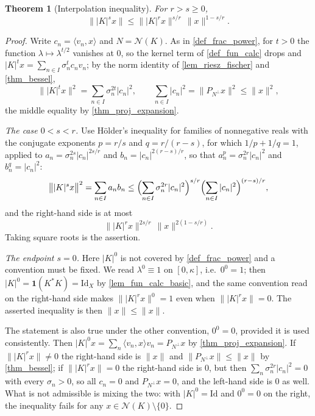 \documentclass[a4paper]{report}
\theoremstyle{plain}
\newtheorem{theorem}{Theorem}[chapter]
\theoremstyle{definition}
\theoremstyle{remark}
\begin{document}
\begin{theorem}[Interpolation inequality]
  \label{thm_interpolation}
  For $r > s \ge 0$,
  \[
    \||K|^sx\| \le \||K|^rx\|^{s/r}\,\|x\|^{1-s/r}.
  \]
\end{theorem}
\begin{proof}
  Write $c_n = \langle v_n,x\rangle$ and $N = \mathcal{N}(K)$.  As in
  \cref{def_frac_power}, for $t > 0$ the function $\lambda \mapsto \lambda^{t/2}$ vanishes
  at $0$, so the kernel term of \cref{def_fun_calc} drops and
  $|K|^tx = \sum_{n\in I}\sigma_n^tc_nv_n$; by the norm identity of
  \cref{lem_riesz_fischer} and \cref{thm_bessel},
  \[
    \bigl\||K|^tx\bigr\|^2 = \sum_{n\in I}\sigma_n^{2t}|c_n|^2 , \qquad
    \sum_{n\in I}|c_n|^2 = \|P_{N^\perp}x\|^2 \le \|x\|^2 ,
  \]
  the middle equality by \cref{thm_proj_expansion}.

  \emph{The case $0 < s < r$.}  Use H\"older's inequality for families of nonnegative reals
  with the conjugate exponents $p = r/s$ and $q = r/(r-s)$, for which
  $1/p + 1/q = 1$, applied to $a_n = \sigma_n^{2s}|c_n|^{2s/r}$ and
  $b_n = |c_n|^{2(r-s)/r}$, so that $a_n^p = \sigma_n^{2r}|c_n|^2$ and $b_n^q = |c_n|^2$:
  \[
    \bigl\||K|^sx\bigr\|^2 = \sum_{n\in I}a_nb_n
      \le \Bigl(\sum_{n\in I}\sigma_n^{2r}|c_n|^2\Bigr)^{s/r}
          \Bigl(\sum_{n\in I}|c_n|^2\Bigr)^{(r-s)/r} ,
  \]
  and the right-hand side is at most
  \[
    \bigl\||K|^rx\bigr\|^{2s/r}\,\|x\|^{2(1-s/r)} .
  \]
  Taking square roots is the assertion.

  \emph{The endpoint $s = 0$.}  Here $|K|^0$ is not covered by \cref{def_frac_power} and a
  convention must be fixed.  We read $\lambda^0 \equiv 1$ on $[0,\kappa]$, i.e.\
  $0^0 = 1$; then $|K|^0 = \mathbf{1}(K^*K) = \mathrm{Id}_X$ by
  \cref{lem_fun_calc_basic}, and the same convention read on the right-hand side makes
  $\||K|^rx\|^0 = 1$ even when $\||K|^rx\| = 0$.  The asserted inequality is then
  $\|x\| \le \|x\|$.

  The statement is also true under the other convention, $0^0 = 0$, provided it is used
  consistently.  Then $|K|^0x = \sum_n\langle v_n,x\rangle v_n = P_{N^\perp}x$ by
  \cref{thm_proj_expansion}.  If $\||K|^rx\| \ne 0$ the right-hand side is $\|x\|$ and
  $\|P_{N^\perp}x\| \le \|x\|$ by \cref{thm_bessel}; if $\||K|^rx\| = 0$ the right-hand
  side is $0$, but then $\sum_n\sigma_n^{2r}|c_n|^2 = 0$ with every $\sigma_n > 0$, so all
  $c_n = 0$ and $P_{N^\perp}x = 0$, and the left-hand side is $0$ as well.  What is not
  admissible is mixing the two: with $|K|^0 = \mathrm{Id}$ and $0^0 = 0$ on the right, the
  inequality fails for any $x \in \mathcal{N}(K)\setminus\{0\}$.
\end{proof}
\end{document}

